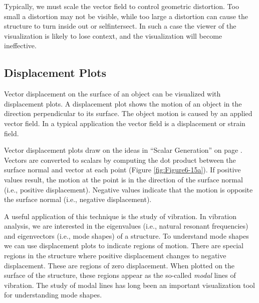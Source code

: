 Typically, we must scale the vector field to control geometric distortion. Too small a distortion may not be visible, while too large a distortion can cause the structure to turn inside out or selfintersect. In such a case the viewer of the visualization is likely to lose context, and the visualization will become ineffective.

\subsection{Displacement Plots}
\label{subsec:displacement_plots}

Vector displacement on the surface of an object can be visualized with displacement plots. A displacement plot shows the motion of an object in the direction perpendicular to its surface. The object motion is caused by an applied vector field. In a typical application the vector field is a displacement or strain field.

Vector displacement plots draw on the ideas in ``Scalar Generation'' on  page \pageref{subsec:scalar_generation}. Vectors are converted to scalars by computing the dot product between the surface normal and vector at each point (Figure \ref{fig:Figure6-15a}). If positive values result, the motion at the point is in the direction of the surface normal (i.e., positive displacement). Negative values indicate that the motion is opposite the surface normal (i.e., negative displacement).

A useful application of this technique is the study of vibration. In vibration analysis, we are interested in the eigenvalues (i.e., natural resonant frequencies) and eigenvectors (i.e., mode shapes) of a structure. To understand mode shapes we can use displacement plots to indicate regions of motion. There are special regions in the structure where positive displacement changes to negative displacement. These are regions of zero displacement. When plotted on the surface of the structure, these regions appear as the so-called \emph{modal} lines of vibration. The study of modal lines has long been an important visualization tool for understanding mode shapes.

